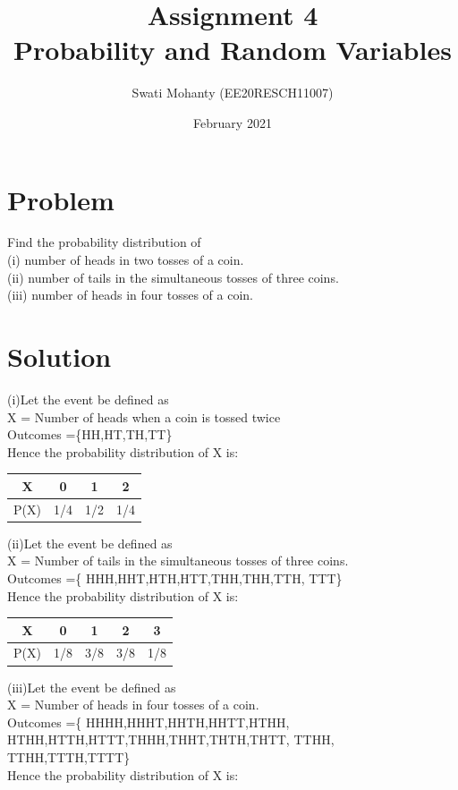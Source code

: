 \documentclass[journal,12pt,twocolumn]{IEEEtran}
\title{Assignment 4
\\Probability and Random Variables }
\author{Swati Mohanty (EE20RESCH11007) }
\date{February 2021}
\begin{document}
\maketitle


\section{Problem}
Find the probability distribution of
\\(i) number of heads in two tosses of a coin.
\\(ii) number of tails in the simultaneous tosses
of three coins.
\\(iii) number of heads in four tosses of a coin.

\section{Solution}

(i)Let the event be defined as
\\X = Number of heads when a coin is tossed twice
\\Outcomes =\{HH,HT,TH,TT\}
\\Hence the probability distribution of X is: 

\begin{center}
\begin{tabular}{ |c|c|c|c| } 
 \hline
 X & 0 & 1 & 2 \\\hline 
 P(X) & 1/4 & 1/2 & 1/4 \\ 
 \hline
\end{tabular}
\end{center}
(ii)Let the event be defined as
\\X = Number of tails in the simultaneous tosses of three coins.
\\Outcomes =\{ HHH,HHT,HTH,HTT,THH,THH,TTH,
TTT\}
\\Hence the probability distribution of X is: 

\begin{center}
\begin{tabular}{ |c|c|c|c|c| } 
 \hline
 X & 0 & 1 & 2 & 3 \\ \hline
 P(X) & 1/8 & 3/8 & 3/8 & 1/8 \\ 
 \hline
\end{tabular}
\end{center}
(iii)Let the event be defined as
\\X = Number of heads in four tosses of a coin.
\\Outcomes =\{ HHHH,HHHT,HHTH,HHTT,HTHH,
HTHH,HTTH,HTTT,THHH,THHT,THTH,THTT,
TTHH, TTHH,TTTH,TTTT\}
\\Hence the probability distribution of X is: 
\end{document}
